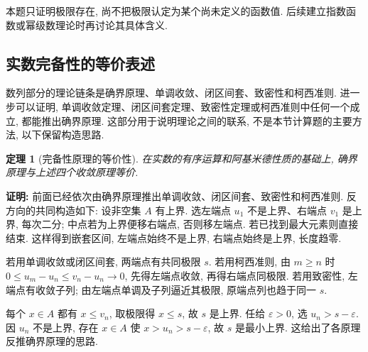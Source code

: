 \documentclass[UTF8,openany]{ctexbook}
\theoremstyle{chinesetextbook}
\newtheorem{theorem}{定理}[section]
\newenvironment{cnproof}{\par\indent\textbf{证明:} \ignorespaces}{\par}
\begin{document}
本题只证明极限存在, 尚不把极限认定为某个尚未定义的函数值. 后续建立指数函数或幂级数理论时再讨论其具体含义.
\subsection{实数完备性的等价表述}
数列部分的理论链条是确界原理、单调收敛、闭区间套、致密性和柯西准则. 进一步可以证明, 单调收敛定理、闭区间套定理、致密性定理或柯西准则中任何一个成立, 都能推出确界原理. 这部分用于说明理论之间的联系, 不是本节计算题的主要方法, 以下保留构造思路.
\begin{theorem}[完备性原理的等价性]
在实数的有序运算和阿基米德性质的基础上, 确界原理与上述四个收敛原理等价.
\end{theorem}
\begin{cnproof}
前面已经依次由确界原理推出单调收敛、闭区间套、致密性和柯西准则. 反方向的共同构造如下: 设非空集 $A$ 有上界. 选左端点 $u_1$ 不是上界、右端点 $v_1$ 是上界, 每次二分; 中点若为上界便移右端点, 否则移左端点. 若已找到最大元素则直接结束. 这样得到嵌套区间, 左端点始终不是上界, 右端点始终是上界, 长度趋零.

若用单调收敛或闭区间套, 两端点有共同极限 $s$. 若用柯西准则, 由 $m\ge n$ 时 $0\le u_m-u_n\le v_n-u_n\to0$, 先得左端点收敛, 再得右端点同极限. 若用致密性, 左端点有收敛子列; 由左端点单调及子列逼近其极限, 原端点列也趋于同一 $s$.

每个 $x\in A$ 都有 $x\le v_n$, 取极限得 $x\le s$, 故 $s$ 是上界. 任给 $\varepsilon>0$, 选 $u_n>s-\varepsilon$. 因 $u_n$ 不是上界, 存在 $x\in A$ 使 $x>u_n>s-\varepsilon$, 故 $s$ 是最小上界. 这给出了各原理反推确界原理的思路.
\end{cnproof}
\end{document}
